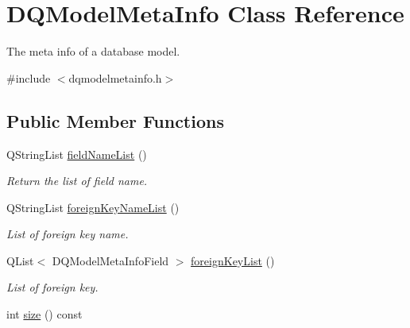 \hypertarget{classDQModelMetaInfo}{
\section{DQModelMetaInfo Class Reference}
\label{classDQModelMetaInfo}
}


The meta info of a database model.  




{\ttfamily \#include $<$dqmodelmetainfo.h$>$}

\subsection*{Public Member Functions}
\begin{DoxyCompactItemize}
\item 
\hypertarget{classDQModelMetaInfo_a00ffe297e95e3f907823bc9d37fcbdc3}{
QStringList \hyperlink{classDQModelMetaInfo_a00ffe297e95e3f907823bc9d37fcbdc3}{fieldNameList} ()}
\label{classDQModelMetaInfo_a00ffe297e95e3f907823bc9d37fcbdc3}

\begin{DoxyCompactList}\small\item\em Return the list of field name. \item\end{DoxyCompactList}\item 
\hypertarget{classDQModelMetaInfo_ac092fff4eb3a875b3263a30e055bc42c}{
QStringList \hyperlink{classDQModelMetaInfo_ac092fff4eb3a875b3263a30e055bc42c}{foreignKeyNameList} ()}
\label{classDQModelMetaInfo_ac092fff4eb3a875b3263a30e055bc42c}

\begin{DoxyCompactList}\small\item\em List of foreign key name. \item\end{DoxyCompactList}\item 
\hypertarget{classDQModelMetaInfo_a8d0ad3aed6d0bf45f61fbb2a0f0ee764}{
QList$<$ DQModelMetaInfoField $>$ \hyperlink{classDQModelMetaInfo_a8d0ad3aed6d0bf45f61fbb2a0f0ee764}{foreignKeyList} ()}
\label{classDQModelMetaInfo_a8d0ad3aed6d0bf45f61fbb2a0f0ee764}

\begin{DoxyCompactList}\small\item\em List of foreign key. \item\end{DoxyCompactList}\item 
\hypertarget{classDQModelMetaInfo_a47f30ad11cbae0cf724d1b5d3bd781c3}{
int \hyperlink{classDQModelMetaInfo_a47f30ad11cbae0cf724d1b5d3bd781c3}{size} () const }
\label{classDQModelMetaInfo_a47f30ad11cbae0cf724d1b5d3bd781c3}


\end{DoxyCompactItemize}
